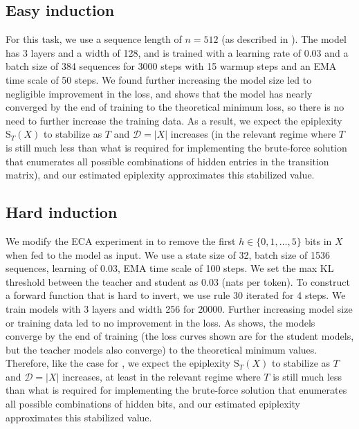 \documentclass[twoside]{article}
\newcommand{\D}{\mathcal{D}}
\newcommand{\rS}{\mathrm{S}}
\begin{document}
\subsection{Easy induction}\label{app:easy-induct}
For this task, we use a sequence length of $n=512$ (as described in ). The model has 3 layers and a width of 128, and is trained with a learning rate of 0.03 and a batch size of 384 sequences for 3000 steps with 15 warmup steps and an EMA time scale of 50 steps. We found further increasing the model size led to negligible improvement in the loss, and  shows that the model has nearly converged by the end of training to the theoretical minimum loss, so there is no need to further increase the training data. As a result, we expect the epiplexity $\rS_T(X)$ to stabilize as $T$ and $\D=|X|$ increases (in the relevant regime where $T$ is still much less than what is required for implementing the brute-force solution that enumerates all possible combinations of hidden entries in the transition matrix), and our estimated epiplexity approximates this stabilized value.

\subsection{Hard induction}\label{app:hard-induct}
We modify the ECA experiment in  to remove the first $h \in \{0,1,\ldots,5\}$ bits in $X$ when fed to the model as input. We use a state size of 32, batch size of 1536 sequences, learning of 0.03, EMA time scale of 100 steps. We set the max KL threshold between the teacher and student as 0.03 (nats per token). To construct a forward function that is hard to invert, we use rule 30 iterated for 4 steps. We train models with 3 layers and width 256 for 20000. Further increasing model size or training data led to no improvement in the loss. As  shows, the models converge by the end of training (the loss curves shown are for the student models, but the teacher models also converge) to the theoretical minimum values. Therefore, like the case for , we expect the epiplexity $\rS_T(X)$ to stabilize as $T$ and $\D=|X|$ increases, at least in the relevant regime where $T$ is still much less than what is required for implementing the brute-force solution that enumerates all possible combinations of hidden bits, and our estimated epiplexity approximates this stabilized value.
\end{document}
